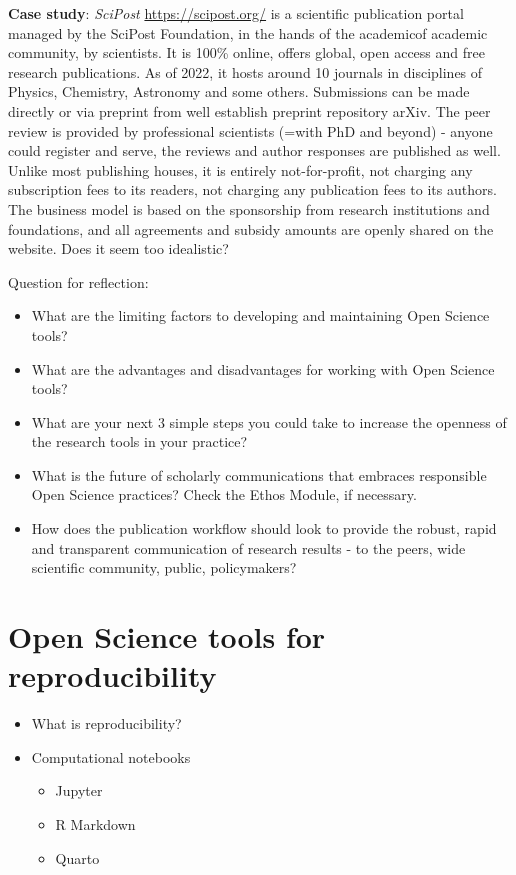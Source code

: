 \documentclass[
  letterpaper,
  DIV=11,
  numbers=noendperiod]{scrreport}
\providecommand{\tightlist}{%
  \setlength{\itemsep}{0pt}\setlength{\parskip}{0pt}}\usepackage{longtable,booktabs,array}
\begin{document}
\textbf{Case study}: \emph{SciPost} \url{https://scipost.org/} is a
scientific publication portal managed by the SciPost Foundation, in the
hands of the academicof academic community, by scientists. It is 100\%
online, offers global, open access and free research publications. As of
2022, it hosts around 10 journals in disciplines of Physics, Chemistry,
Astronomy and some others. Submissions can be made directly or via
preprint from well establish preprint repository arXiv. The peer review
is provided by professional scientists (=with PhD and beyond) - anyone
could register and serve, the reviews and author responses are published
as well. Unlike most publishing houses, it is entirely not-for-profit,
not charging any subscription fees to its readers, not charging any
publication fees to its authors. The business model is based on the
sponsorship from research institutions and foundations, and all
agreements and subsidy amounts are openly shared on the website. Does it
seem too idealistic?

Question for reflection:

\begin{itemize}
\tightlist
\item
  What are the limiting factors to developing and maintaining Open
  Science tools?
\item
  What are the advantages and disadvantages for working with Open
  Science tools?
\item
  What are your next 3 simple steps you could take to increase the
  openness of the research tools in your practice?
\item
  What is the future of scholarly communications that embraces
  responsible Open Science practices? Check the Ethos Module, if
  necessary.
\item
  How does the publication workflow should look to provide the robust,
  rapid and transparent communication of research results - to the
  peers, wide scientific community, public, policymakers?
\end{itemize}

\hypertarget{open-science-tools-for-reproducibility}{%
\chapter{Open Science tools for
reproducibility}\label{open-science-tools-for-reproducibility}}

\begin{itemize}
\tightlist
\item
  What is reproducibility?
\item
  Computational notebooks

  \begin{itemize}
  \tightlist
  \item
    Jupyter
  \item
    R Markdown
  \item
    Quarto
  \end{itemize}
\end{itemize}
\end{document}
